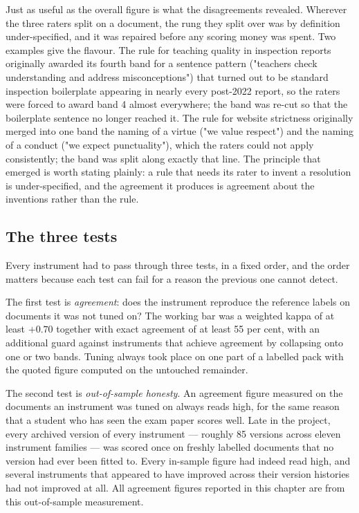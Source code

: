 Just as useful as the overall figure is what the disagreements revealed.
Wherever the three raters split on a document, the rung they split over was
by definition under-specified, and it was repaired before any scoring money
was spent. Two examples give the flavour. The rule for teaching quality in
inspection reports originally awarded its fourth band for a sentence pattern
("teachers check understanding and address misconceptions") that turned out
to be standard inspection boilerplate appearing in nearly every post-2022
report, so the raters were forced to award band 4 almost everywhere; the
band was re-cut so that the boilerplate sentence no longer reached it. The
rule for website strictness originally merged into one band the naming of a
virtue ("we value respect") and the naming of a conduct ("we expect
punctuality"), which the raters could not apply consistently; the band was
split along exactly that line. The principle that emerged is worth stating
plainly: a rule that needs its rater to invent a resolution is
under-specified, and the agreement it produces is agreement about the
inventions rather than the rule.

\subsection{The three tests}
\label{sec:p1_scoring_tests}

Every instrument had to pass through three tests, in a fixed order, and the
order matters because each test can fail for a reason the previous one
cannot detect.

The first test is \textit{agreement}: does the instrument reproduce the
reference labels on documents it was not tuned on? The working bar was a
weighted kappa of at least $+0.70$ together with exact agreement of at least
55 per cent, with an additional guard against instruments that achieve
agreement by collapsing onto one or two bands. Tuning always took place on
one part of a labelled pack with the quoted figure computed on the untouched
remainder.

The second test is \textit{out-of-sample honesty}. An agreement figure
measured on the documents an instrument was tuned on always reads high, for
the same reason that a student who has seen the exam paper scores well.
Late in the project, every archived version of every instrument --- roughly
85 versions across eleven instrument families --- was scored once on freshly
labelled documents that no version had ever been fitted to. Every in-sample
figure had indeed read high, and several instruments that appeared to have
improved across their version histories had not improved at all. All
agreement figures reported in this chapter are from this out-of-sample
measurement.


